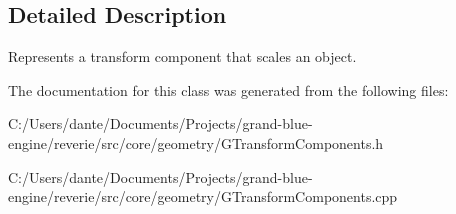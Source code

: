 \subsection{Detailed Description}
Represents a transform component that scales an object. 

The documentation for this class was generated from the following files\+:\begin{DoxyCompactItemize}
\item 
C\+:/\+Users/dante/\+Documents/\+Projects/grand-\/blue-\/engine/reverie/src/core/geometry/G\+Transform\+Components.\+h\item 
C\+:/\+Users/dante/\+Documents/\+Projects/grand-\/blue-\/engine/reverie/src/core/geometry/G\+Transform\+Components.\+cpp\end{DoxyCompactItemize}
